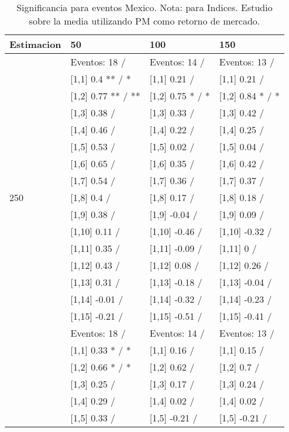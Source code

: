 \begin{table}

\caption{Significancia para eventos Mexico. Nota: para Indices. Estudio sobre la media utilizando PM como retorno de mercado.}
\centering
\begin{tabular}[t]{llll}
\toprule
Estimacion & 50 & 100 & 150\\
\midrule
 & Eventos:  18 / & Eventos:  14 / & Eventos:  13 /\\
 & {}[1,1] 0.4 ** / * & {}[1,1] 0.21  / & {}[1,1] 0.21  /\\
 & {}[1,2] 0.77 ** / ** & {}[1,2] 0.75 * / * & {}[1,2] 0.84 * / *\\
 & {}[1,3] 0.38  / & {}[1,3] 0.33  / & {}[1,3] 0.42  /\\
 & {}[1,4] 0.46  / & {}[1,4] 0.22  / & {}[1,4] 0.25  /\\
\addlinespace
 & {}[1,5] 0.53  / & {}[1,5] 0.02  / & {}[1,5] 0.04  /\\
 & {}[1,6] 0.65  / & {}[1,6] 0.35  / & {}[1,6] 0.42  /\\
 & {}[1,7] 0.54  / & {}[1,7] 0.36  / & {}[1,7] 0.37  /\\
250 & {}[1,8] 0.4  / & {}[1,8] 0.17  / & {}[1,8] 0.18  /\\
 & {}[1,9] 0.38  / & {}[1,9] -0.04  / & {}[1,9] 0.09  /\\
\addlinespace
 & {}[1,10] 0.11  / & {}[1,10] -0.46  / & {}[1,10] -0.32  /\\
 & {}[1,11] 0.35  / & {}[1,11] -0.09  / & {}[1,11] 0  /\\
 & {}[1,12] 0.43  / & {}[1,12] 0.08  / & {}[1,12] 0.26  /\\
 & {}[1,13] 0.31  / & {}[1,13] -0.18  / & {}[1,13] -0.04  /\\
 & {}[1,14] -0.01  / & {}[1,14] -0.32  / & {}[1,14] -0.23  /\\
\addlinespace
 & {}[1,15] -0.21  / & {}[1,15] -0.51  / & {}[1,15] -0.41  /\\
 & Eventos:  18 / & Eventos:  14 / & Eventos:  13 /\\
 & {}[1,1] 0.33 * / * & {}[1,1] 0.16  / & {}[1,1] 0.15  /\\
 & {}[1,2] 0.66 * / * & {}[1,2] 0.62  / & {}[1,2] 0.7  /\\
 & {}[1,3] 0.25  / & {}[1,3] 0.17  / & {}[1,3] 0.24  /\\
\addlinespace
 & {}[1,4] 0.29  / & {}[1,4] 0.02  / & {}[1,4] 0.02  /\\
 & {}[1,5] 0.33  / & {}[1,5] -0.21  / & {}[1,5] -0.21  /\\

\end{tabular}
\end{table}

